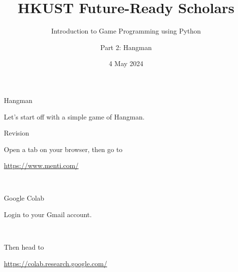 \documentclass[dvipsnames, svgnames, x11names]{beamer}
\title[HKUST Future-Ready Scholars]{HKUST Future-Ready Scholars}
\subtitle{Introduction to Game Programming using Python}
\author[Game Programming using Python]{Part 2: Hangman}
\date[May 2024]{4 May 2024}
\begin{document}

\frame{\titlepage}

\begin{frame}[fragile]{Hangman}
    \begin{center}
        Let's start off with a simple game of Hangman.
    \end{center}
\end{frame}

\begin{frame}[fragile]{Revision}
    \begin{center}
        Open a tab on your browser, then go to

        \href{https://www.menti.com/}{https://www.menti.com/}

        \

    \end{center}
\end{frame}

\begin{frame}[fragile]{Google Colab}
    \begin{center}
        Login to your Gmail account.

        \

        Then head to

        \href{https://colab.research.google.com/}{https://colab.research.google.com/}
    \end{center}
\end{frame}
\end{document}
